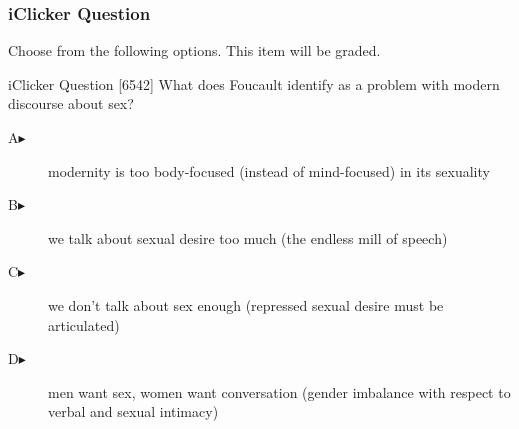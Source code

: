 \documentclass[xcolor=dvipsnames]{beamer}
\begin{document}

\begin{frame}
  \frametitle{iClicker Question}
Choose from the following options. This item will be graded.
\begin{block}{iClicker Question}
[6542] What does Foucault identify as a problem with modern discourse about sex?
\end{block}
\begin{description}
\item[A\hspace{.2in}$\blacktriangleright$] modernity is too
  body-focused (instead of mind-focused) in its sexuality
\item[B\hspace{.2in}$\blacktriangleright$] we talk about sexual desire too much
  (the endless mill of speech)
\item[C\hspace{.2in}$\blacktriangleright$] we don't talk about sex
  enough (repressed sexual desire must be articulated)
\item[D\hspace{.2in}$\blacktriangleright$] men want sex, women want
  conversation (gender imbalance with respect to verbal and sexual
  intimacy)
\end{description}
\end{frame}
\end{document}
